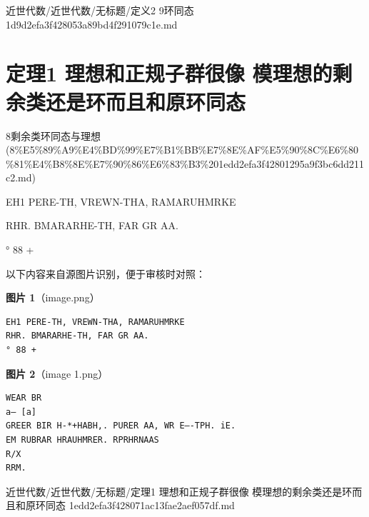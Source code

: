 \begin{note}[来源路径]

近世代数/近世代数/无标题/定义2 9环同态 1d9d2efa3f428053a89bd4f291079c1e.md

\end{note}

\section*{定理1 理想和正规子群很像 模理想的剩余类还是环而且和原环同态}

\begin{note}[来源上级主题]

8剩余类环同态与理想 (8\%E5\%89\%A9\%E4\%BD\%99\%E7\%B1\%BB\%E7\%8E\%AF\%E5\%90\%8C\%E6\%80\%81\%E4\%B8\%8E\%E7\%90\%86\%E6\%83\%B3\%201edd2efa3f42801295a9f3bc6dd211c2.md)

\end{note}

\begin{theorem}

EH1 PERE-TH, VREWN-THA, RAMARUHMRKE

RHR. BMARARHE-TH, FAR GR AA.

° 88 +

\end{theorem}

\begin{note}
以下内容来自源图片识别，便于审核时对照：

\textbf{图片 1}（image.png）
\begin{Verbatim}[fontsize=\small]
EH1 PERE-TH, VREWN-THA, RAMARUHMRKE
RHR. BMARARHE-TH, FAR GR AA.
° 88 +
\end{Verbatim}

\textbf{图片 2}（image 1.png）
\begin{Verbatim}[fontsize=\small]
WEAR BR
a— [a]
GREER BIR H-*+HABH,. PURER AA, WR E—-TPH. iE.
EM RUBRAR HRAUHMRER. RPRHRNAAS
R/X
RRM.
\end{Verbatim}

\end{note}

\begin{note}[来源路径]

近世代数/近世代数/无标题/定理1 理想和正规子群很像 模理想的剩余类还是环而且和原环同态 1edd2efa3f428071ac13fae2aef057df.md

\end{note}


